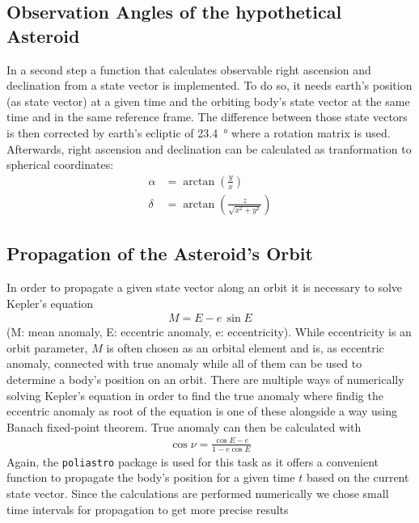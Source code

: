 \documentclass[11pt, a4paper]{article}
\numberwithin{equation}{section}
\begin{document}
\subsection{Observation Angles of the hypothetical Asteroid}

In a second step a function that calculates observable right ascension and declination from a state vector is implemented. 
To do so, it needs earth's position (as state vector) at a given time and the orbiting body's state vector at the same time and in the same reference frame.
The difference between those state vectors is then corrected by earth's ecliptic of \SI{23.4}{\degree} where a rotation matrix is used.
Afterwards, right ascension and declination can be calculated as tranformation to spherical coordinates:
\begin{align}
\alpha &= \arctan\left(\frac{y}{x}\right) \\
\delta &= \arctan\left(\frac{z}{\sqrt{x^2 + y^2}}\right)
\end{align}

\subsection{Propagation of the Asteroid's Orbit}
In order to propagate  a given state vector along an orbit it is necessary to solve Kepler's equation
\begin{align}
	M = E - e\, \sin E
\end{align}
(M: mean anomaly, E: eccentric anomaly, e: eccentricity).
While eccentricity is an orbit parameter, $M$ is often chosen as an orbital element and is, as eccentric anomaly, connected with true anomaly while all of them can be used to determine a body's position on an orbit.
There are multiple ways of numerically solving Kepler's equation in order to find the true anomaly where findig the eccentric anomaly as root of the equation is one of these alongside a way using Banach fixed-point theorem.
True anomaly can then be calculated with
\begin{align}
\cos\nu = \frac{\cos E - e}{1 - e \cos E}
\end{align}
Again, the \texttt{poliastro} package is used for this task as it offers a convenient function to propagate the body's position for a given time $t$ based on the current state vector.
Since the calculations are performed numerically we chose small time intervals for propagation to get more precise results
\end{document}
